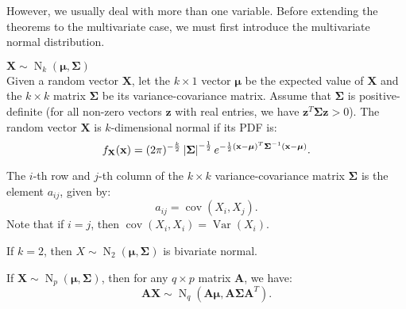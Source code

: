 \documentclass{huhtakm-template-book-v2}
\DeclareMathOperator{\Var}{Var}
\DeclareMathOperator{\cov}{cov}
\DeclareMathOperator{\N}{N}
\begin{document}
    However, we usually deal with more than one variable. Before extending the theorems to the multivariate case, we must first introduce the multivariate normal distribution.
    \begin{eg} $\mathbf{X} \sim \N_{k}(\boldsymbol{\mu}, \mathbf{\Sigma})$\\
        Given a random vector $\mathbf{X}$, let the $k \times 1$ vector $\boldsymbol{\mu}$ be the expected value of $\mathbf{X}$ and the $k \times k$ matrix $\mathbf{\Sigma}$ be its variance-covariance matrix. Assume that $\mathbf{\Sigma}$ is positive-definite (for all non-zero vectors $\mathbf{z}$ with real entries, we have $\mathbf{z}^{T} \mathbf{\Sigma z} > 0$). The random vector $\mathbf{X}$ is $k$-dimensional normal if its PDF is:
        \begin{equation*}
            f_{\mathbf{X}}(\mathbf{x}) = (2\pi)^{-\frac{k}{2}} \left|{\mathbf{\Sigma}}\right|^{-\frac{1}{2}} e^{-\frac{1}{2} (\mathbf{x} - \boldsymbol{\mu})^{T} \mathbf{\Sigma}^{-1} (\mathbf{x} - \boldsymbol{\mu})}.
        \end{equation*}
    \end{eg}
    \begin{rem}
        The $i$-th row and $j$-th column of the $k \times k$ variance-covariance matrix $\mathbf{\Sigma}$ is the element $a_{ij}$, given by:
        \begin{equation*}
            a_{ij} = \cov(X_{i}, X_{j}).
        \end{equation*}
        Note that if $i = j$, then $\cov(X_{i}, X_{i}) = \Var(X_{i})$.
    \end{rem}
    \begin{eg}
        If $k = 2$, then $X \sim \N_{2}(\boldsymbol{\mu}, \mathbf{\Sigma})$ is bivariate normal.
    \end{eg}
    \begin{lem}
        \label{Chapter 1 (Lemma) Distribution of matrix multiplication with random vector}
        If $\mathbf{X} \sim \N_{p}(\boldsymbol{\mu}, \mathbf{\Sigma})$, then for any $q \times p$ matrix $\mathbf{A}$, we have:
        \begin{equation*}
            \mathbf{AX} \sim \N_{q}(\mathbf{A} \boldsymbol{\mu}, \mathbf{A\Sigma A}^{T}).
        \end{equation*}
    \end{lem}
\end{document}
